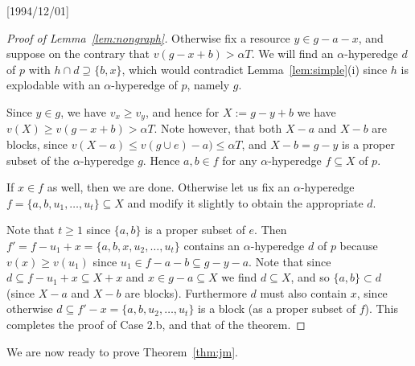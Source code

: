\NeedsTeXFormat{LaTeX2e}[1994/12/01]\documentclass[letterpaper, 11pt]{article}
\theoremstyle{definition}
\theoremstyle{remark}
\numberwithin{equation}{section}
\begin{document}
\begin{proof}[Proof of Lemma~\ref{lem:nongraph}]
Otherwise fix a resource $y\in g-a-x$,
and suppose on the contrary that $v(g- x+b)>\alpha T$.
We will find an $\alpha$-hyperedge $d$ of $p$ with $h \cap d \supseteq
\{ b , x\}$, which 
would contradict Lemma~\ref{lem:simple}(i) since $h$ is explodable with an
$\alpha$-hyperedge of $p$, namely $g$.

Since $y\in g$, we have $v_x\geq v_y$, and hence for $X:=g- y+b$ 
we have  $v(X) \geq v(g-x+b)  >\alpha T$. Note however, that both $X-a$ and $X-b$ are
blocks, since $v(X-a) \leq v(g\cup e) -a) \leq \alpha T$, and $X-b=g-y$ is a
proper subset of the $\alpha$-hyperedge $g$.
Hence $a, b \in f$ for any $\alpha$-hyperedge $f\subseteq X$ of $p$.

If $x \in f$ as well, then we are done.
Otherwise let us fix an $\alpha$-hyperedge $f=\{a,b,u_1,\ldots,u_t\}
\subseteq X$ and modify it slightly
to obtain the appropriate $d$.

Note that $t\geq 1$ since $\{ a, b\}$ is a proper subset of $e$.
Then $f'= f- u_1 +x = \{a,b,x,u_2,\ldots,u_t\}$
contains an $\alpha$-hyperedge $d$ of $p$ because $v(x)\geq v(u_1)$
since $u_1 \in f-a-b \subseteq g-y-a$.
Note that since $d\subseteq
f-u_1+x\subseteq X+x$ and $x\in g-a \subseteq X$ we find
$d\subseteq X$, and so $\{a,b\}\subset d$ (since $X-a$ and $X-b$ are
blocks). 
Furthermore $d$ must also contain $x$, since otherwise 
$d \subseteq f'-x = \{a,b,u_2,\ldots,u_t\}$ is a block (as a proper
subset of $f$).
This completes the proof of Case 2.b, and that of the theorem.
\end{proof}

We are now ready to prove Theorem~\ref{thm:jm}.
 
\end{document}
